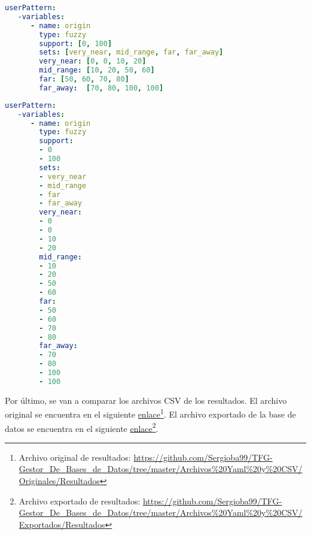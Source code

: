 \begin{lstlisting}[language=YAML,
                   frame=none,
                   numbers=none,
                   basicstyle=\ttfamily\normalsize,
                   caption={Fragmento del archivo demand\_data original},
                   label=src:originDemand_dataOriginal,
                   inputencoding=utf8]                   
userPattern:
   -variables:
      - name: origin
        type: fuzzy
        support: [0, 100]
        sets: [very_near, mid_range, far, far_away]
        very_near: [0, 0, 10, 20]
        mid_range: [10, 20, 50, 60]
        far: [50, 60, 70, 80]
        far_away:  [70, 80, 100, 100]
\end{lstlisting}

\begin{lstlisting}[language=YAML,
                   frame=none,
                   numbers=none,
                   basicstyle=\ttfamily\normalsize,
                   caption={Fragmento del archivo demand\_data exportado por la aplicación},
                   label=src:originDemand_dataExported,
                   inputencoding=utf8]                   
userPattern:
   -variables:
      - name: origin
        type: fuzzy
        support:
        - 0
        - 100
        sets:
        - very_near
        - mid_range
        - far
        - far_away
        very_near:
        - 0
        - 0
        - 10
        - 20
        mid_range:
        - 10
        - 20
        - 50
        - 60
        far:
        - 50
        - 60
        - 70
        - 80
        far_away:
        - 70
        - 80
        - 100
        - 100
\end{lstlisting}

Por último, se van a comparar los archivos \acrshort{CSV} de los resultados. El archivo original se encuentra en el siguiente \href{https://github.com/Sergioba99/TFG-Gestor_De_Bases_de_Datos/tree/master/Archivos%20Yaml%20y%20CSV/Originales/Resultados}{enlace}\footnote{Archivo original de resultados: \url{https://github.com/Sergioba99/TFG-Gestor\_De\_Bases\_de\_Datos/tree/master/Archivos\%20Yaml\%20y\%20CSV/Originales/Resultados}}. El archivo exportado de la base de datos se encuentra en el siguiente \href{https://github.com/Sergioba99/TFG-Gestor_De_Bases_de_Datos/tree/master/Archivos%20Yaml%20y%20CSV/Exportados/Resultados}{enlace}\footnote{Archivo exportado de resultados: \url{https://github.com/Sergioba99/TFG-Gestor\_De\_Bases\_de\_Datos/tree/master/Archivos\%20Yaml\%20y\%20CSV/Exportados/Resultados}}.



